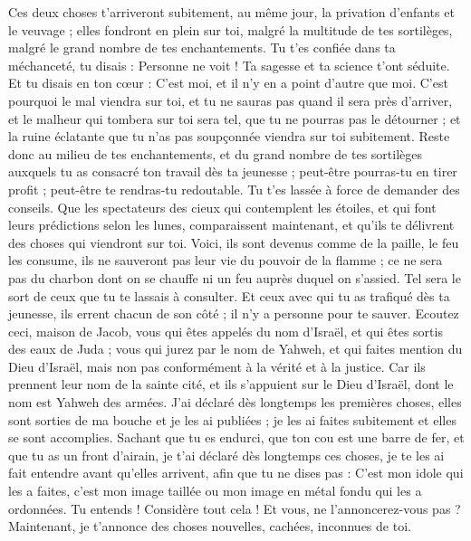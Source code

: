 \begin{multicols}{2}
Ces deux choses t'arriveront subitement, au même jour, la privation d'enfants et le veuvage ; elles fondront en plein sur toi, malgré la multitude de tes sortilèges, malgré le grand nombre de tes enchantements.
Tu t'es confiée dans ta méchanceté, tu disais : Personne ne voit ! Ta sagesse et ta science t'ont séduite. Et tu disais en ton cœur : C'est moi, et il n'y en a point d'autre que moi.
 C'est pourquoi le mal viendra sur toi, et tu ne sauras pas quand il sera près d'arriver, et le malheur qui tombera sur toi sera tel, que tu ne pourras pas le détourner ; et la ruine éclatante que tu n'as pas soupçonnée viendra sur toi subitement.
Reste donc au milieu de tes enchantements, et du grand nombre de tes sortilèges auxquels tu as consacré ton travail dès ta jeunesse ; peut-être pourras-tu en tirer profit ; peut-être te rendras-tu redoutable.
Tu t'es lassée à force de demander des conseils. Que les spectateurs des cieux qui contemplent les étoiles, et qui font leurs prédictions selon les lunes, comparaissent maintenant, et qu'ils te délivrent des choses qui viendront sur toi.
Voici, ils sont devenus comme de la paille, le feu les consume, ils ne sauveront pas leur vie du pouvoir de la flamme ; ce ne sera pas du charbon dont on se chauffe ni un feu auprès duquel on s'assied.
Tel sera le sort de ceux que tu te lassais à consulter. Et ceux avec qui tu as trafiqué dès ta jeunesse, ils errent chacun de son côté ; il n'y a personne pour te sauver.
\VerseOne{}Ecoutez ceci, maison de Jacob, vous qui êtes appelés du nom d'Israël, et qui êtes sortis des eaux de Juda ; vous qui jurez par le nom de Yahweh, et qui faites mention du Dieu d'Israël, mais non pas conformément à la vérité et à la justice.
Car ils prennent leur nom de la sainte cité, et ils s'appuient sur le Dieu d'Israël, dont le nom est Yahweh des armées.
J'ai déclaré dès longtemps les premières choses, elles sont sorties de ma bouche et je les ai publiées ; je les ai faites subitement et elles se sont accomplies.
Sachant que tu es endurci, que ton cou est une barre de fer, et que tu as un front d'airain,
je t'ai déclaré dès longtemps ces choses, je te les ai fait entendre avant qu'elles arrivent, afin que tu ne dises pas : C'est mon idole qui les a faites, c'est mon image taillée ou mon image en métal fondu qui les a ordonnées.
Tu entends ! Considère tout cela ! Et vous, ne l'annoncerez-vous pas ? Maintenant, je t'annonce des choses nouvelles, cachées, inconnues de toi.

\end{multicols}
